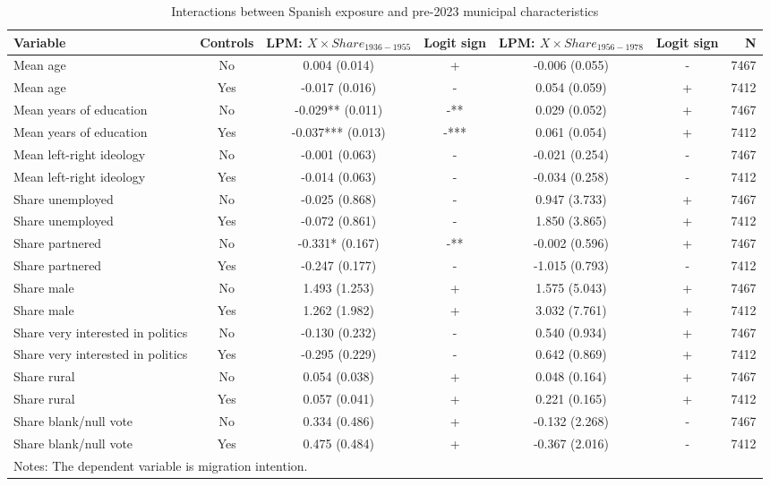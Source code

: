 \begin{table}[!htbp]
\centering
\caption{Interactions between Spanish exposure and pre-2023 municipal characteristics}
\label{tab:share_interactions_combined_key}
\small
\begin{tabular}{lcccccr}
\hline
Variable & Controls & LPM: $X \times Share_{1936-1955}$ & Logit sign & LPM: $X \times Share_{1956-1978}$ & Logit sign & N \\
\hline
Mean age & No & 0.004 (0.014) & + & -0.006 (0.055) & - & 7467 \\
Mean age & Yes & -0.017 (0.016) & - & 0.054 (0.059) & + & 7412 \\
Mean years of education & No & -0.029** (0.011) & -** & 0.029 (0.052) & + & 7467 \\
Mean years of education & Yes & -0.037*** (0.013) & -*** & 0.061 (0.054) & + & 7412 \\
Mean left-right ideology & No & -0.001 (0.063) & - & -0.021 (0.254) & - & 7467 \\
Mean left-right ideology & Yes & -0.014 (0.063) & - & -0.034 (0.258) & - & 7412 \\
Share unemployed & No & -0.025 (0.868) & - & 0.947 (3.733) & + & 7467 \\
Share unemployed & Yes & -0.072 (0.861) & - & 1.850 (3.865) & + & 7412 \\
Share partnered & No & -0.331* (0.167) & -** & -0.002 (0.596) & + & 7467 \\
Share partnered & Yes & -0.247 (0.177) & - & -1.015 (0.793) & - & 7412 \\
Share male & No & 1.493 (1.253) & + & 1.575 (5.043) & + & 7467 \\
Share male & Yes & 1.262 (1.982) & + & 3.032 (7.761) & + & 7412 \\
Share very interested in politics & No & -0.130 (0.232) & - & 0.540 (0.934) & + & 7467 \\
Share very interested in politics & Yes & -0.295 (0.229) & - & 0.642 (0.869) & + & 7412 \\
Share rural & No & 0.054 (0.038) & + & 0.048 (0.164) & + & 7467 \\
Share rural & Yes & 0.057 (0.041) & + & 0.221 (0.165) & + & 7412 \\
Share blank/null vote & No & 0.334 (0.486) & + & -0.132 (2.268) & - & 7467 \\
Share blank/null vote & Yes & 0.475 (0.484) & + & -0.367 (2.016) & - & 7412 \\
\hline
\multicolumn{7}{l}{\footnotesize Notes: The dependent variable is migration intention.} \\

\end{tabular}
\end{table}
